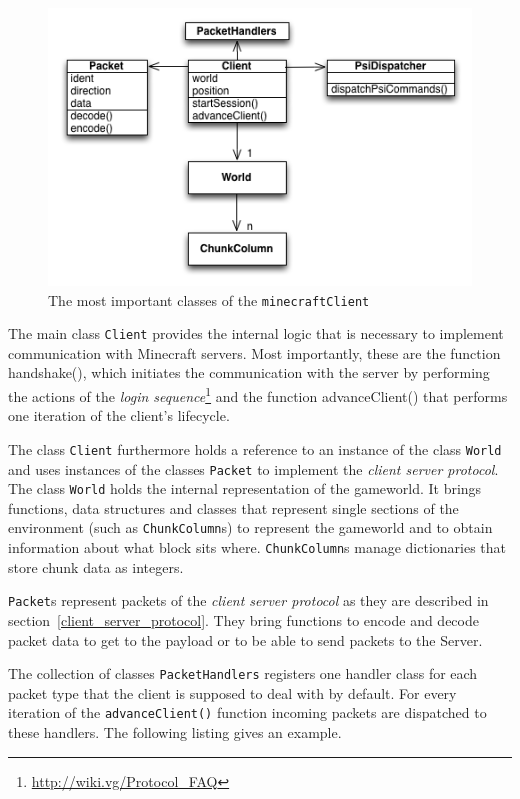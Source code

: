 
\begin{figure}[h]
  \centering
    \includegraphics[width=12cm]{graphics/spockUML_v13_2}
  \caption{The most important classes of the \texttt{minecraftClient}}
  \label{spock_UML}
\end{figure}

The main class \texttt{Client} provides the internal logic that is necessary to implement communication with Minecraft servers. Most importantly, these are the function handshake(), which initiates the communication with the server by performing the actions of the \emph{login sequence}\footnote{\url{http://wiki.vg/Protocol_FAQ}} and the function advanceClient() that performs one iteration of the client's lifecycle.


The class \texttt{Client} furthermore holds a reference to an instance of the class \texttt{World} and uses instances of the classes \texttt{Packet} to implement the \emph{client server protocol}. The class \texttt{World} holds the internal representation of the gameworld. It brings functions, data structures and classes that represent single sections of the environment (such as \texttt{ChunkColumn}s) to represent the gameworld and to obtain information about what block sits where. \texttt{ChunkColumn}s manage dictionaries that store chunk data as integers.

\texttt{Packet}s represent packets of the \emph{client server protocol} as they are described in section~\ref{client_server_protocol}. They bring functions to encode and decode packet data to get to the payload or to be able to send packets to the Server.

The collection of classes \texttt{PacketHandlers} registers one handler class for each packet type that the client is supposed to deal with by default. For every iteration of the \texttt{advanceClient()} function incoming packets are dispatched to these handlers. The following listing gives an example.


